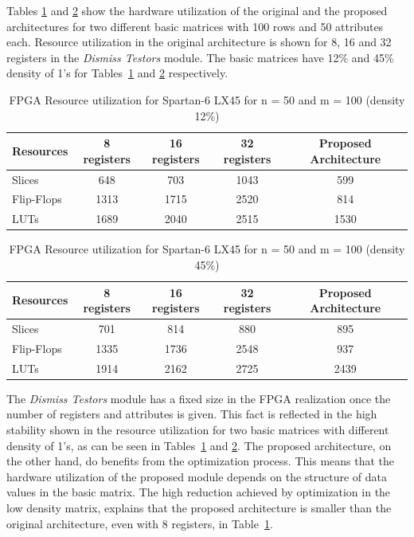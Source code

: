 \documentclass[conference]{IEEEtran}
\begin{document}
Tables \ref{tabResource12} and \ref{tabResource45} show the hardware utilization of the original and the 
proposed architectures for two different basic matrices with 100 rows and 50 attributes each. Resource utilization 
in the original architecture is shown for 8, 16 and 32 registers in the \textit{Dismiss Testors} module. The 
basic matrices have 12\% and 45\% density of 1's for Tables~\ref{tabResource12} and \ref{tabResource45} respectively.

\begin{table}[htb]
	\renewcommand{\arraystretch}{1.3}
	\caption{FPGA Resource utilization for Spartan-6 LX45 for n = 50 and m = 100 (density 12\%)}
	\label{tabResource12}
	\centering
	\begin{tabular}{lcccc}
	 	\hline                       
	  	Resources & 8 registers & 16 registers & 32 registers & Proposed Architecture\\
	  	\hline
	  	Slices     & 648  & 703  & 1043 & 599 \\
	  	Flip-Flops & 1313 & 1715 & 2520 & 814 \\
	  	LUTs       & 1689 & 2040 & 2515 & 1530 \\
	 	\hline 
	\end{tabular}
\end{table}

\begin{table}[htb]
	\renewcommand{\arraystretch}{1.3}
	\caption{FPGA Resource utilization for Spartan-6 LX45 for n = 50 and m = 100 (density 45\%)}
	\label{tabResource45}
	\centering
	\begin{tabular}{lcccc}
	 	\hline                       
	  	Resources & 8 registers & 16 registers & 32 registers & Proposed Architecture\\
	  	\hline
	  	Slices     & 701  & 814  & 880  & 895 \\
	  	Flip-Flops & 1335 & 1736 & 2548 & 937 \\
	  	LUTs       & 1914 & 2162 & 2725 & 2439 \\
	 	\hline 
	\end{tabular}
\end{table}

The \textit{Dismiss Testors} module has a fixed size in the FPGA realization once the number of registers and  attributes is given. This fact is reflected in the high stability shown in the resource utilization for 
two basic matrices with different density of 1's, as can be seen in Tables~\ref{tabResource12} and 
\ref{tabResource45}. The proposed architecture, on the other hand, do benefits from the optimization process. 
This means that the hardware utilization of the proposed module depends on the structure of data values in the 
basic matrix. The high reduction achieved by optimization in the low density matrix, explains that the proposed 
architecture is smaller than the original architecture, even with 8 registers, in Table~\ref{tabResource12}.
\end{document}

